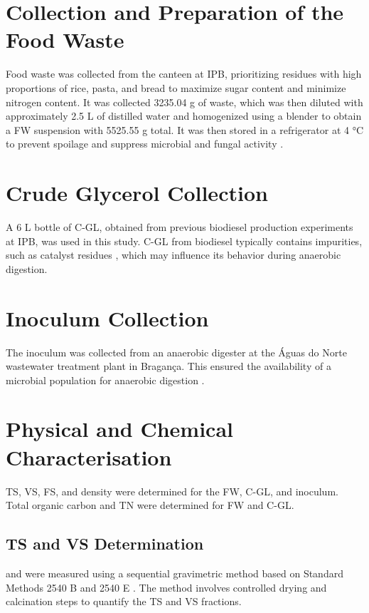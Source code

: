 \documentclass[12pt, a4paper, oneside]{report}
\begin{document}
\section{Collection and Preparation of the Food Waste}

Food waste was collected from the canteen at IPB, prioritizing residues with high proportions of rice, pasta, and bread to maximize sugar content and minimize nitrogen content. It was collected 3235.04 g of waste, which was then diluted with approximately 2.5 L of distilled water and homogenized using a blender to obtain a FW suspension with 5525.55 g total. It was then stored in a refrigerator at 4 °C to prevent spoilage and suppress microbial and fungal activity \parencite{degueurce2020}.

\section{Crude Glycerol Collection}

A 6 L bottle of C-GL, obtained from previous biodiesel production experiments at IPB, was used in this study. C-GL from biodiesel typically contains impurities, such as catalyst residues \parencite{attarbachi2023}, which may influence its behavior during anaerobic digestion.

\section{Inoculum Collection}

The inoculum was collected from an anaerobic digester at the Águas do Norte wastewater treatment plant in Bragança. This ensured the availability of a microbial population for anaerobic digestion \parencite{posmanik2020}.

\section{Physical and Chemical Characterisation}

TS, VS, FS, and density were determined for the FW, C-GL, and inoculum. Total organic carbon and TN were determined for FW and C-GL.

\subsection{TS and VS Determination}

 and  were measured using a sequential gravimetric method based on Standard Methods 2540 B and 2540 E \parencite{apha2023}. The method involves controlled drying and calcination steps to quantify the TS and VS fractions.
\end{document}
